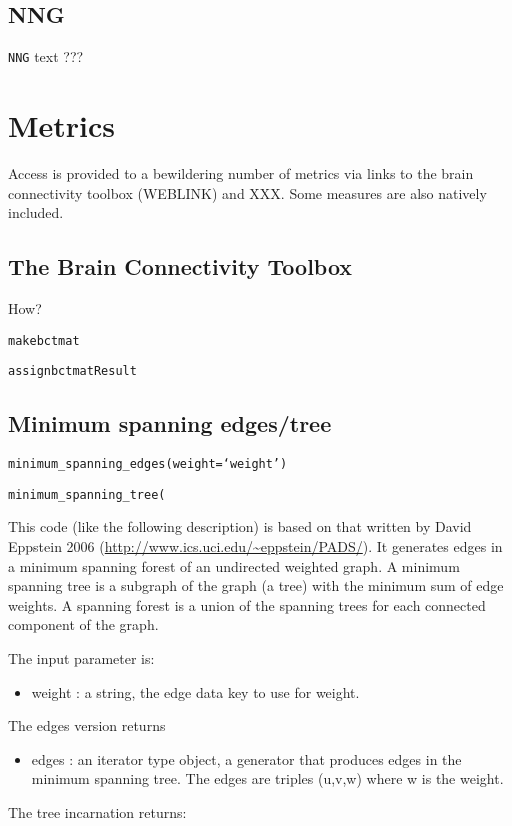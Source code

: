 \documentclass{report}
\begin{document}
\subsection{NNG}
\texttt{NNG} text ???

\section{Metrics}
Access is provided to a bewildering number of metrics via links to the brain connectivity toolbox (WEBLINK) and XXX. Some measures are also natively included.


\subsection{The Brain Connectivity Toolbox}
How?

\texttt{makebctmat}

\texttt{assignbctmatResult}


\subsection{Minimum spanning edges/tree}
\texttt{minimum\_spanning\_edges(weight=`weight')}

\texttt{minimum\_spanning\_tree(}

\vspace{12pt}

This code (like the following description) is based on that written by David Eppstein 2006 (\url{http://www.ics.uci.edu/~eppstein/PADS/}). It generates edges in a minimum spanning forest of an undirected weighted graph. A minimum spanning tree is a subgraph of the graph (a tree) with the minimum sum of edge weights.  A spanning forest is a union of the spanning trees for each connected component of the graph.
    
The input parameter is:
        \begin{itemize}
\item       weight : a string, the edge data key to use for weight.
\end{itemize}
        The edges version returns
\begin{itemize}
\item  edges : an iterator type object, a generator that produces edges in the minimum spanning tree.
The edges are triples (u,v,w) where w is the weight.
\end{itemize}        

The tree incarnation returns:
\end{document}
